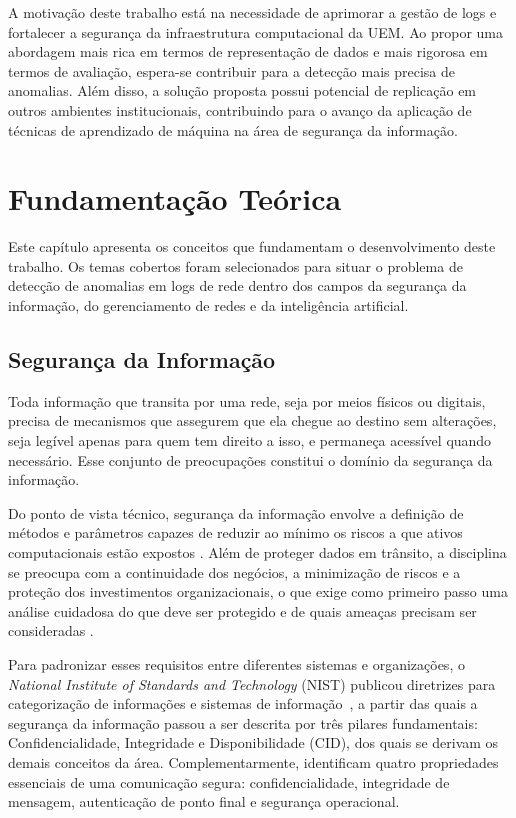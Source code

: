 \documentclass[12pt,a4paper]{report}
\begin{document}
A motivação deste trabalho está na necessidade de aprimorar a gestão de logs e fortalecer a segurança da infraestrutura computacional da UEM. Ao propor uma abordagem mais rica em termos de representação de dados e mais rigorosa em termos de avaliação, espera-se contribuir para a detecção mais precisa de anomalias. Além disso, a solução proposta possui potencial de replicação em outros ambientes institucionais, contribuindo para o avanço da aplicação de técnicas de aprendizado de máquina na área de segurança da informação.

\chapter{Fundamentação Teórica}

Este capítulo apresenta os conceitos que fundamentam o desenvolvimento deste trabalho. Os temas cobertos foram selecionados para situar o problema de detecção de anomalias em logs de rede dentro dos campos da segurança da informação, do gerenciamento de redes e da inteligência artificial.

\section{Segurança da Informação}

Toda informação que transita por uma rede, seja por meios físicos ou
digitais, precisa de mecanismos que assegurem que ela chegue ao destino
sem alterações, seja legível apenas para quem tem direito a isso, e
permaneça acessível quando necessário. Esse conjunto de preocupações
constitui o domínio da segurança da informação.

Do ponto de vista técnico, segurança da informação envolve a definição de
métodos e parâmetros capazes de reduzir ao mínimo
os riscos a que ativos computacionais estão
expostos \cite{stallings2014}. Além de proteger dados em trânsito, a
disciplina se preocupa com a continuidade dos negócios, a minimização de
riscos e a proteção dos investimentos organizacionais, o que exige como
primeiro passo uma análise cuidadosa do que deve ser protegido e de quais
ameaças precisam ser consideradas \cite{hintzbergen2018}.

Para padronizar esses requisitos entre diferentes sistemas e
organizações, o \textit{National Institute of Standards and Technology}
(NIST) publicou diretrizes para categorização de informações e sistemas
de informação~\cite{nist2004}, a partir das quais a segurança da
informação passou a ser descrita por três pilares fundamentais:
Confidencialidade, Integridade e Disponibilidade (CID), dos quais se
derivam os demais conceitos da área. Complementarmente,
 identificam quatro propriedades essenciais de uma
comunicação segura: confidencialidade, integridade de mensagem,
autenticação de ponto final e segurança operacional.
\end{document}
